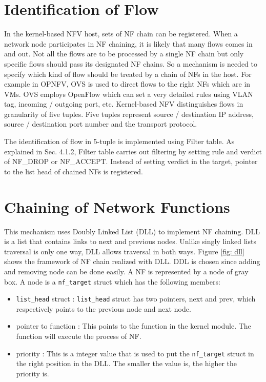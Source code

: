 \section{Identification of Flow}
In the kernel-based NFV host, sets of NF chain can be registered. When a network node participates in NF chaining, it is likely that many flows comes in and out. Not all the flows are to be processed by a single NF chain but only specific flows should pass its designated NF chains. So a mechanism is needed to specify which kind of flow should be treated by a chain of NFs in the host. For example in OPNFV, OVS is used to direct flows to the right NFs which are in VMs. OVS employs OpenFlow which can set a very detailed rules using VLAN tag, incoming / outgoing port, etc. Kernel-based NFV distinguishes flows in granularity of five tuples. Five tuples represent source / destination IP address, source / destination port number and the transport protocol. 

The identification of flow in 5-tuple is implemented using Filter table. As explained in Sec. 4.1.2, Filter table carries out filtering by setting rule and verdict of NF\_DROP or NF\_ACCEPT. Instead of setting verdict in the target, pointer to the list head of chained NFs is registered. 

\section{Chaining of Network Functions}
This mechanism uses Doubly Linked List (DLL) to implement NF chaining. DLL is a list that contains links to next and previous nodes. Unlike singly linked lists traversal is only one way, DLL allows traversal in both ways. 
Figure \ref{fig: dll} shows the framework of NF chain realized with DLL. DDL is chosen since adding and removing node can be done easily. A NF is represented by a node of gray box. A node is a {\tt nf\_target} struct which has the following members: 
\begin{itemize}
	\item {\tt list\_head} struct : {\tt list\_head} struct has two pointers, next and prev, which respectively points to the previous node and next node. 
	\item pointer to function : This points to the function in the kernel module. The function will execute the process of NF.
	\item priority : This is a integer value that is used to put the {\tt nf\_target} struct in the right position in the DLL. The smaller the value is, the higher the priority is.
\end{itemize}

